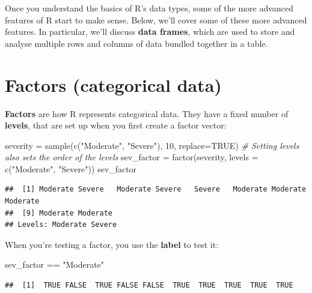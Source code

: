 \documentclass[
]{book}
\newenvironment{Shaded}{\begin{snugshade}}{\end{snugshade}}
\newcommand{\AttributeTok}[1]{\textcolor[rgb]{0.77,0.63,0.00}{#1}}
\newcommand{\CommentTok}[1]{\textcolor[rgb]{0.56,0.35,0.01}{\textit{#1}}}
\newcommand{\ConstantTok}[1]{\textcolor[rgb]{0.00,0.00,0.00}{#1}}
\newcommand{\DecValTok}[1]{\textcolor[rgb]{0.00,0.00,0.81}{#1}}
\newcommand{\FunctionTok}[1]{\textcolor[rgb]{0.00,0.00,0.00}{#1}}
\newcommand{\NormalTok}[1]{#1}
\newcommand{\OtherTok}[1]{\textcolor[rgb]{0.56,0.35,0.01}{#1}}
\newcommand{\SpecialCharTok}[1]{\textcolor[rgb]{0.00,0.00,0.00}{#1}}
\newcommand{\StringTok}[1]{\textcolor[rgb]{0.31,0.60,0.02}{#1}}
\begin{document}
Once you understand the basics of R's data types, some of the more
advanced features of R start to make sense. Below, we'll cover
some of these more advanced features. In particular, we'll discuss
\textbf{data frames}, which are used to store and analyse multiple
rows and columns of data bundled together in a table.

\hypertarget{factors-categorical-data}{%
\section{Factors (categorical data)}\label{factors-categorical-data}}

\textbf{Factors} are how R represents categorical data. They
have a fixed number of \textbf{levels}, that are set up when you first
create a factor vector:

\begin{Shaded}
\begin{Highlighting}[]
\NormalTok{severity }\OtherTok{=} \FunctionTok{sample}\NormalTok{(}\FunctionTok{c}\NormalTok{(}\StringTok{"Moderate"}\NormalTok{, }\StringTok{"Severe"}\NormalTok{), }\DecValTok{10}\NormalTok{, }\AttributeTok{replace=}\ConstantTok{TRUE}\NormalTok{)}
\CommentTok{\# Setting \textquotesingle{}levels\textquotesingle{} also sets the order of the levels}
\NormalTok{sev\_factor }\OtherTok{=} \FunctionTok{factor}\NormalTok{(severity, }\AttributeTok{levels =} \FunctionTok{c}\NormalTok{(}\StringTok{"Moderate"}\NormalTok{, }\StringTok{"Severe"}\NormalTok{))}
\NormalTok{sev\_factor}
\end{Highlighting}
\end{Shaded}

\begin{verbatim}
##  [1] Moderate Severe   Moderate Severe   Severe   Moderate Moderate Moderate
##  [9] Moderate Moderate
## Levels: Moderate Severe
\end{verbatim}

When you're testing a factor, you use the \textbf{label} to test it:

\begin{Shaded}
\begin{Highlighting}[]
\NormalTok{sev\_factor }\SpecialCharTok{==} \StringTok{"Moderate"}
\end{Highlighting}
\end{Shaded}

\begin{verbatim}
##  [1]  TRUE FALSE  TRUE FALSE FALSE  TRUE  TRUE  TRUE  TRUE  TRUE
\end{verbatim}
\end{document}
